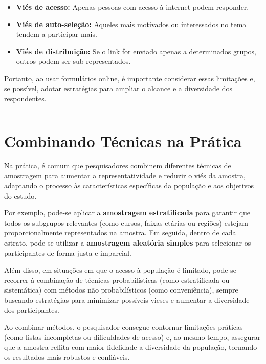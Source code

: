 \documentclass[
]{book}
\providecommand{\tightlist}{%
  \setlength{\itemsep}{0pt}\setlength{\parskip}{0pt}}
\begin{document}
\begin{itemize}
\tightlist
\item
  \textbf{Viés de acesso:} Apenas pessoas com acesso à internet podem responder.
\item
  \textbf{Viés de auto-seleção:} Aqueles mais motivados ou interessados no tema tendem a participar mais.
\item
  \textbf{Viés de distribuição:} Se o link for enviado apenas a determinados grupos, outros podem ser sub-representados.
\end{itemize}

Portanto, ao usar formulários online, é importante considerar essas limitações e, se possível, adotar estratégias para ampliar o alcance e a diversidade dos respondentes.

\begin{center}\rule{0.5\linewidth}{0.5pt}\end{center}

\section{Combinando Técnicas na Prática}\label{combinando-tuxe9cnicas-na-pruxe1tica}

Na prática, é comum que pesquisadores combinem diferentes técnicas de amostragem para aumentar a representatividade e reduzir o viés da amostra, adaptando o processo às características específicas da população e aos objetivos do estudo.

Por exemplo, pode-se aplicar a \textbf{amostragem estratificada} para garantir que todos os subgrupos relevantes (como cursos, faixas etárias ou regiões) estejam proporcionalmente representados na amostra. Em seguida, dentro de cada estrato, pode-se utilizar a \textbf{amostragem aleatória simples} para selecionar os participantes de forma justa e imparcial.

Além disso, em situações em que o acesso à população é limitado, pode-se recorrer à combinação de técnicas probabilísticas (como estratificada ou sistemática) com métodos não probabilísticos (como conveniência), sempre buscando estratégias para minimizar possíveis vieses e aumentar a diversidade dos participantes.

Ao combinar métodos, o pesquisador consegue contornar limitações práticas (como listas incompletas ou dificuldades de acesso) e, ao mesmo tempo, assegurar que a amostra reflita com maior fidelidade a diversidade da população, tornando os resultados mais robustos e confiáveis.
\end{document}
